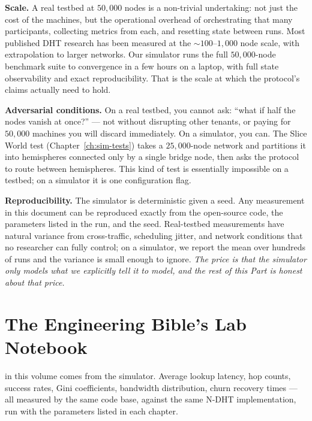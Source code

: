\documentclass[twoside,nobib]{tufte-book}
\newcommand{\NDHT}{N-DHT\xspace}
\begin{document}
\textbf{Scale.} A real testbed at $50{,}000$ nodes is a
non-trivial undertaking: not just the cost of the machines, but
the operational overhead of orchestrating that many participants,
collecting metrics from each, and resetting state between runs.
Most published DHT research has been measured at the
$\sim 100$--$1{,}000$ node scale, with extrapolation to larger
networks. Our simulator runs the full
$50{,}000$-node benchmark suite to convergence in a few hours on
a laptop, with full state observability and exact reproducibility.
That is the scale at which the protocol's claims actually need to
hold.

\textbf{Adversarial conditions.} On a real testbed, you cannot
ask: ``what if half the nodes vanish at once?'' --- not without
disrupting other tenants, or paying for $50{,}000$ machines you
will discard immediately. On a simulator, you can. The Slice
World test (Chapter~\ref{ch:sim-tests}) takes a $25{,}000$-node
network and partitions it into hemispheres connected only by a
single bridge node, then asks the protocol to route between
hemispheres. This kind of test is essentially impossible on a
testbed; on a simulator it is one configuration flag.

\textbf{Reproducibility.} The simulator is deterministic given a
seed. Any measurement in this document can be reproduced exactly
from the open-source code, the parameters listed in the run, and
the seed. Real-testbed measurements have natural variance from
cross-traffic, scheduling jitter, and network conditions that no
researcher can fully control; on a simulator, we report the
mean over hundreds of runs and the variance is small enough to
ignore. \emph{The price is that the simulator only models what we
explicitly tell it to model, and the rest of this Part is honest
about that price.}

\section{The Engineering Bible's Lab Notebook}

 in this volume comes from
the simulator. Average lookup latency, hop counts, success rates,
Gini coefficients, bandwidth distribution, churn recovery times
--- all measured by the same code base, against the same
\NDHT implementation, run with the parameters listed in each
chapter.
\end{document}
